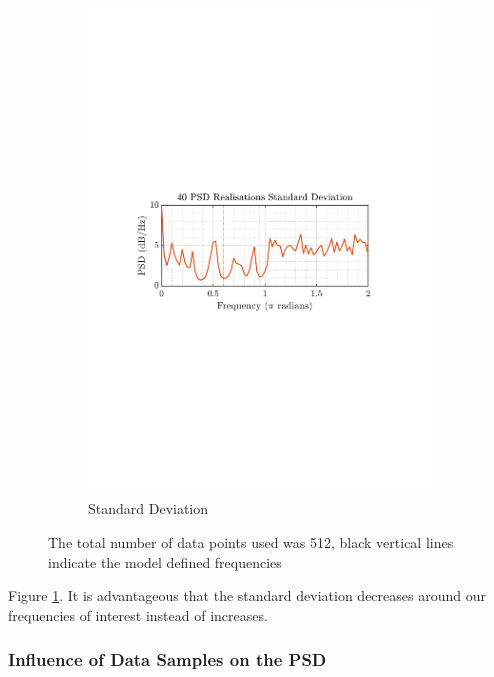 \documentclass[12pt]{article}
\numberwithin{equation}{section}
\begin{document}
\begin{figure}[H]
\begin{subfigure}{0.49\textwidth}
			\includegraphics[trim={2.2cm 11.2cm 3.15cm  11.2cm}, clip, width=\textwidth]{../MATLAB/figures/q1_3c_fig02.pdf} 
			\captionsetup{justification=centering}
			\caption{Standard Deviation}
		\end{subfigure}
		\captionsetup{justification=centering}
		\caption{The total number of data points used was 512, black vertical lines indicate the model defined frequencies}
		\label{fig: 1-3c}
	\end{figure}

	Figure \ref{fig: 1-3c}. It is advantageous that the standard deviation decreases around our frequencies of interest instead of increases. 

	\subsubsection{Influence of Data Samples on the PSD}
	
\end{document}
